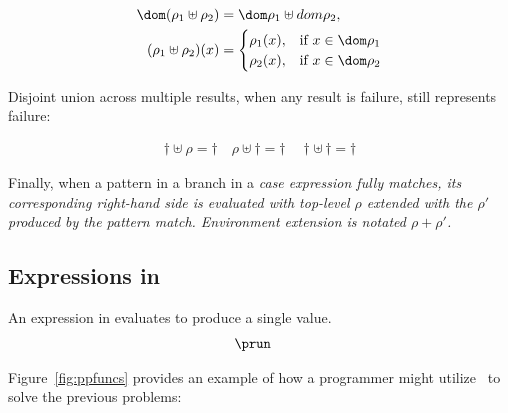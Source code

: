 \documentclass[manuscript,screen,review, 12pt, nonacm]{acmart}
\begin{document}
\begin{align*}
  \dom(\rho_{1} \uplus \rho_{2}) &= \dom \rho_{1} \uplus dom \rho_{2}, \\
    (\rho_{1} \uplus \rho_{2})(x) &= 
  \begin{cases}
    \rho_{1}(x), & \text{if } x \in \dom  \rho_{1} \\
    \rho_{2}(x), & \text{if } x \in \dom \rho_{2} \\
\end{cases}
\end{align*}

Disjoint union across multiple results, when any result is failure, still
represents failure: 

\begin{gather*}
  \dagger \uplus \rho = \dagger \quad
  \rho \uplus \dagger = \dagger \quad
  \dagger \uplus\, \dagger = \dagger
\end{gather*}

Finally, when a pattern in a branch in a \it{case} expression fully matches, its
corresponding right-hand side is evaluated with top-level $\rho$ extended with
the $\rho'$ produced by the pattern match. Environment extension is notated
$\rho + \rho'$. 

\subsection{Expressions in \PPlus}

    An expression in {\PPlus} evaluates to produce a single value. 
    \begin{align*}
        &\prun
    \end{align*}
    
    \ppsemantics 
      
      \bigskip 

    
    Figure~\ref{fig:ppfuncs} provides an example of how a programmer might utilize
    \PPlus\ to solve the previous problems: 
\end{document}
